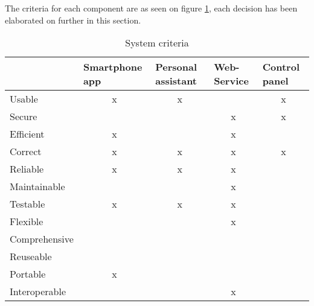 The criteria for each component are as seen on figure \ref{tab:non-functional}, each decision has been elaborated on further in this section.



\begin{table}[H]
\centering
\begin{tabular}{|l|c|c|c|c|}
\hline
              & \multicolumn{1}{l|}{Smartphone app} & \multicolumn{1}{l|}{Personal assistant} & \multicolumn{1}{l|}{Web-Service} & \multicolumn{1}{l|}{Control panel} \\ \hline
Usable        & x                                   & x                                &                              & x                                  \\ \hline
Secure        &                                     &                                  & x                            & x                                  \\ \hline
Efficient     & x                                   &                                  & x                            &                                    \\ \hline
Correct       & x                                   & x                                & x                            & x                                  \\ \hline
Reliable      & x                                   & x                                & x                            &                                    \\ \hline
Maintainable  &                                     &                                  & x                            &                                    \\ \hline
Testable      & x                                   & x                                & x                            &                                    \\ \hline
Flexible      &                                     &                                  & x                            &                                    \\ \hline
Comprehensive &                                     &                                  &                              &                                    \\ \hline
Reuseable     &                                     &                                  &                              &                                    \\ \hline
Portable      & x                                   &                                  &                              &                                    \\ \hline
Interoperable &                                     &                                  & x                            &                                    \\ \hline
\end{tabular}
\caption{System criteria}
\label{tab:non-functional}
\end{table}



